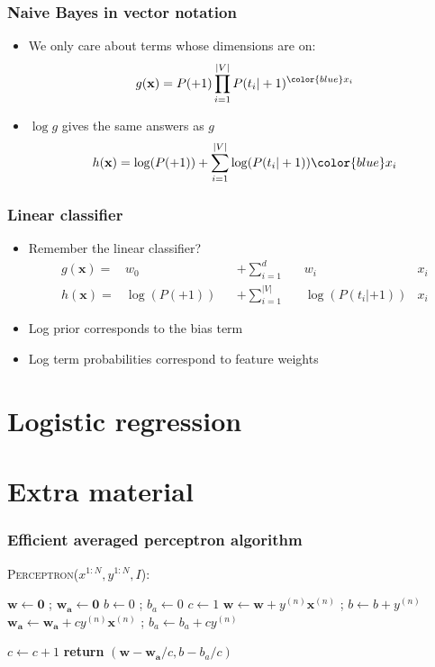 \documentclass[14pt,mathserif]{beamer}
\newcommand{\vecb}[1]{\mathbf{#1}}
\newcommand{\x}{\mathbf{x}}
\begin{document}
\begin{frame}
  \frametitle{Naive Bayes in vector notation}
  \begin{itemize}
  \item 
    We only care about terms whose dimensions are on:
    \[
      g(\x) = P(+1) \prod_{i=1}^{|V|} P(t_i|+1)^{\color{blue} x_i}
    \]
  \item $\log g$ gives the same answers as $g$
    \begin{align}
      h(\x) = \log(P(+1)) + \sum_{i=1}^{|V|} \log(P(t_i|+1))\color{blue}x_i
    \end{align}
  \end{itemize}
\end{frame}

\begin{frame}
  \frametitle{Linear classifier}
  \begin{itemize}
  \item Remember the linear classifier?
    \begin{align}\nonumber
      g(\x) = & w_0               &  & + \sum_{i=1}^d      && w_i 
                            & x_i \\\nonumber
      h(\x) = & \log(P(+1))       &  & + \sum_{i=1}^{|V|}  &&  \log(P(t_i|+1))
                            & x_i 
    \end{align} 
  \item Log prior corresponds to the bias term
  \item Log term probabilities correspond to feature weights
  \end{itemize}
\end{frame}

\section{Logistic regression}

\section{Extra material}
\begin{frame}
\frametitle{Efficient averaged perceptron algorithm}
 \begin{block}{\textsc{Perceptron}($x^{1:N},y^{1:N},I$):}
\begin{algorithmic}[1]
\STATE $\vecb{w} \leftarrow \vecb{0}$ ; $\vecb{w_a} \leftarrow \vecb{0}$
\STATE $b \leftarrow 0$ ; $b_a \leftarrow 0$
\STATE $c \leftarrow 1$
    		\IF {$y^{(n)} (\vecb{w}\cdot \x^{(n)}+b) \leq 0$}
        		\STATE $\vecb{w} \leftarrow \vecb{w} + y^{(n)} \x^{(n)}$ ; $b \leftarrow b + y^{(n)}$
			\STATE $\vecb{w_a} \leftarrow \vecb{w_a} + c y^{(n)} \x^{(n)}$ ; $b_a \leftarrow b_a + c y^{(n)}$

    		\ENDIF
        \STATE $c \leftarrow c + 1$
    	\ENDFOR
\ENDFOR
\STATE \textbf{return} $(\vecb{w}-\vecb{w_a}/c, b - b_a/c)$
\end{algorithmic}                 \end{block}
\end{frame}
\end{document}
